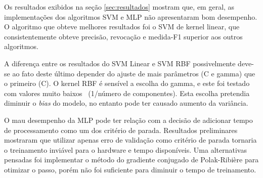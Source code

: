 \documentclass[conference]{IEEEtran}
\begin{document}
Os resultados exibidos na seção \ref{sec:resultados} mostram que, em geral, as implementações dos algoritmos SVM e MLP não apresentaram bom desempenho. O algoritmo que obteve melhores resultados foi o SVM de kernel linear, que consistentemente obteve precisão, revocação e medida-F1 superior aos outros algoritmos.

A diferença entre os resultados do SVM Linear e SVM RBF possivelmente deve-se ao fato deste último depender do ajuste de mais parâmetros (C e gamma) que o primeiro (C). O kernel RBF é sensível a escolha do gamma, e este foi testado com valores muito baixos ~(1/número de componentes). Esta escolha pretendia diminuir o \textit{bias} do modelo, no entanto pode ter causado aumento da variância.

O mau desempenho da MLP pode ter relação com a decisão de adicionar tempo de processamento como um dos critério de parada. Resultados preliminares mostraram que utilizar apenas erro de validação como critério de parada tornaria o treinamento inviável para o hardware e tempo disponíveis. Uma alternativas pensadas foi implementar o método do gradiente conjugado de Polak-Ribière para otimizar o passo, porém não foi suficiente para diminuir o tempo de treinamento. 






\end{document}
